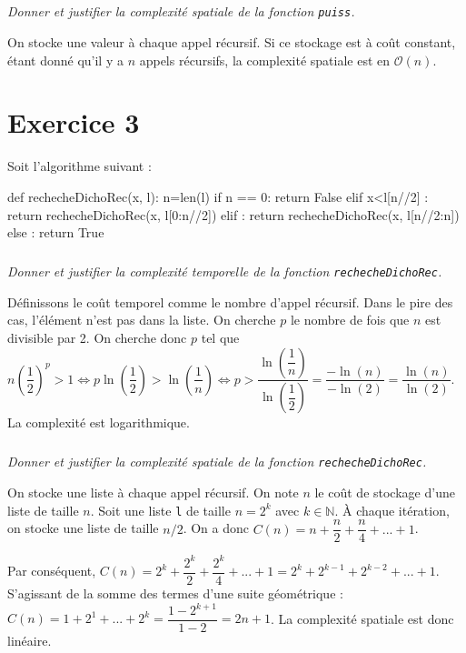 \documentclass[10pt,fleqn]{book} %
\begin{document}
\begin{multicols}{2}
\subparagraph{}
\textit{Donner et justifier la complexité spatiale de la fonction \texttt{puiss}.}
\ifprof
\begin{corrige}
On stocke une valeur à chaque appel récursif. Si ce stockage est à coût constant, étant donné qu'il y a $n$ appels récursifs, la complexité spatiale est en $\mathcal{O}(n)$.
\end{corrige}
\else
\fi



\section*{Exercice 3}
\setcounter{exo}{0}

Soit l'algorithme suivant : 

\begin{py}
\begin{python}
def rechecheDichoRec(x, l):
    n=len(l)
    if n == 0:
        return False
    elif x<l[n//2] :
        return rechecheDichoRec(x, l[0:n//2])
    elif :
        return rechecheDichoRec(x, l[n//2:n])
    else :
        return True
\end{python}
\end{py}

\subparagraph{}
\textit{Donner et justifier la complexité temporelle de la fonction \texttt{rechecheDichoRec}.}
\ifprof
\begin{corrige}
Définissons le coût temporel comme le nombre d'appel récursif. Dans le pire des cas, l'élément n'est pas dans la liste. 
 On cherche $p$ le nombre de fois que $n$ est divisible par 2. On cherche donc $p$ tel que $n\left(\dfrac{1}{2}\right)^p>1 \Leftrightarrow p\ln \left(\dfrac{1}{2}\right)>\ln\left(\dfrac{1}{n}\right) \Leftrightarrow  p>\dfrac{\ln\left(\dfrac{1}{n}\right)}{\ln\left(\dfrac{1}{2}\right)} =\dfrac{-\ln\left(n\right)}{-\ln\left(2 \right)}   =\dfrac{\ln\left(n\right)}{\ln\left(2 \right)}$. La complexité est logarithmique. 
\end{corrige}
\else
\fi

\subparagraph{}
\textit{Donner et justifier la complexité spatiale de la fonction \texttt{rechecheDichoRec}.}
\ifprof
\begin{corrige}
On stocke une liste à chaque appel récursif. On note $n$ le coût de stockage d'une liste de taille $n$. Soit une liste \texttt{l} de taille $n=2^k$ avec $k\in \mathbb{N}$. 
À chaque itération, on stocke une liste de taille $n/2$.
On a donc $C(n)=n+\dfrac{n}{2}+\dfrac{n}{4}+...+1$. 

Par conséquent, $C(n)=2^k+\dfrac{2^k}{2}+\dfrac{2^k}{4}+...+1=2^k+2^{k-1}+2^{k-2}+...+1$. S'agissant de la somme des termes d'une suite géométrique :
$C(n)=1+2^1+...+2^k =\dfrac{1-2^{k+1}}{1-2} =2n+1$. La complexité spatiale est donc linéaire. 
\end{corrige}
\else
\fi



\end{multicols}
\end{document}
